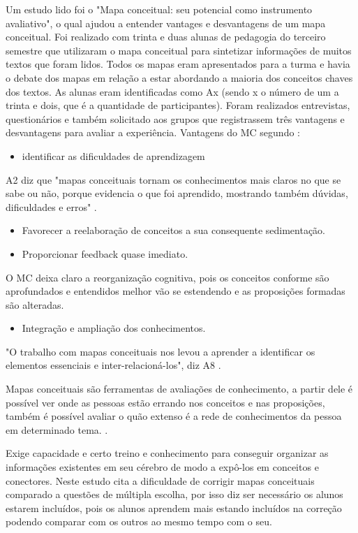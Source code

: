 Um estudo lido foi o "Mapa conceitual: seu potencial como instrumento avaliativo", o qual ajudou a entender vantages e desvantagens de um mapa conceitual. Foi realizado com trinta e duas alunas de pedagogia do terceiro semestre que utilizaram o mapa conceitual para sintetizar informações de muitos textos que foram lidos. Todos os mapas eram apresentados para a turma e havia o debate dos mapas em relação a estar abordando a maioria dos conceitos chaves dos textos. As alunas eram identificadas como Ax (sendo x o número de um a trinta e dois, que é a quantidade de participantes). Foram realizados entrevistas, questionários e também solicitado aos grupos que registrassem três vantagens e desvantagens para avaliar a experiência. Vantagens do MC segundo \cite{vantagensDesvantagensMC}: 

\begin{itemize}
\item identificar as dificuldades de aprendizagem
\end{itemize}
A2 diz que "mapas conceituais tornam os conhecimentos mais claros no que se sabe ou não, porque evidencia o que foi aprendido, mostrando também dúvidas, dificuldades e erros" \cite{vantagensDesvantagensMC}.


 \begin{itemize}
\item Favorecer a reelaboração de conceitos a sua consequente sedimentação.
\item Proporcionar feedback quase imediato.
\end{itemize}


 O MC deixa claro a reorganização cognitiva, pois os conceitos conforme são aprofundados e entendidos melhor vão se estendendo e as proposições formadas são alteradas.\cite{vantagensDesvantagensMC}


 \begin{itemize}
\item Integração e ampliação dos conhecimentos.
\end{itemize}
"O trabalho com mapas conceituais nos levou a aprender a identificar os elementos essenciais e inter-relacioná-los", diz A8 \cite{vantagensDesvantagensMC}.

 Mapas conceituais são ferramentas de avaliações de conhecimento, a partir dele é possível ver onde as pessoas estão errando nos conceitos e nas proposições, também é possível avaliar o quão extenso é a rede de conhecimentos da pessoa em determinado tema. \cite{vantagensDesvantagensMC}.

 Exige capacidade e certo treino e conhecimento para conseguir organizar as informações existentes em seu cérebro de modo a expô-los em conceitos e conectores.
Neste estudo \cite{dificuldadesMapaConceitual} cita a dificuldade de corrigir mapas conceituais comparado a questões de múltipla escolha, por isso diz ser necessário os alunos estarem incluídos, pois os alunos aprendem mais estando incluídos na correção podendo comparar com os outros ao mesmo tempo com o seu.

